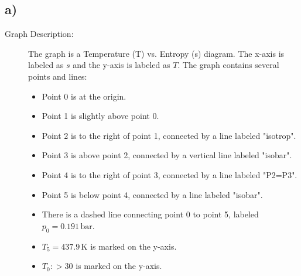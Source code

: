 

\subsection*{a)}

\begin{description}
    \item[Graph Description:] The graph is a Temperature (T) vs. Entropy (s) diagram. The x-axis is labeled as $s$ and the y-axis is labeled as $T$. The graph contains several points and lines:
    \begin{itemize}
        \item Point 0 is at the origin.
        \item Point 1 is slightly above point 0.
        \item Point 2 is to the right of point 1, connected by a line labeled "isotrop".
        \item Point 3 is above point 2, connected by a vertical line labeled "isobar".
        \item Point 4 is to the right of point 3, connected by a line labeled "P2=P3".
        \item Point 5 is below point 4, connected by a line labeled "isobar".
        \item There is a dashed line connecting point 0 to point 5, labeled $p_0 = 0.191 \, \text{bar}$.
        \item $T_5 = 437.9 \, \text{K}$ is marked on the y-axis.
        \item $T_0: > 30$ is marked on the y-axis.
    \end{itemize}
\end{description}